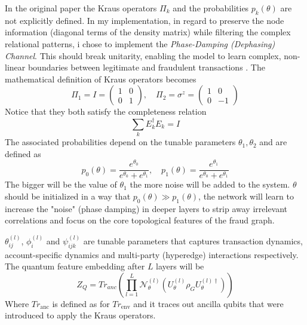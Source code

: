 In the original paper the Kraus operators \(\Pi_k\) and the probabilities \(p_k(\theta)\) are not explicitly defined. In my implementation, in regard to preserve the node information (diagonal terms of the density matrix) while filtering the complex relational patterns, i chose to implement the \textit{Phase-Damping (Dephasing) Channel}. This should break unitarity, enabling the model to learn complex, non-linear boundaries between legitimate and fraudulent transactions \cite{phasedamp}.
The mathematical definition of Kraus operators becomes
\begin{equation}
    \Pi_1 = I = \begin{pmatrix} 1 & 0 \\ 0 & 1 \end{pmatrix}, \quad \Pi_2 = \sigma^z = \begin{pmatrix} 1 & 0 \\ 0 & -1 \end{pmatrix}
\end{equation}
Notice that they both satisfy the completeness relation
\begin{equation}
    \sum_{k} E_k^\dagger E_k = I
\end{equation}
The associated probabilities depend on the tunable parameters \(\theta_1, \theta_2\) and are defined as
\begin{equation}
    p_0(\theta) = \frac{e^{\theta_0}}{e^{\theta_0} + e^{\theta_1}}, \quad p_1(\theta) = \frac{e^{\theta_1}}{e^{\theta_0} + e^{\theta_1}}
\end{equation}
The bigger will be the value of \(\theta_1\) the more noise will be added to the system. \(\theta\) should be initialized in a way that \(p_0(\theta) \gg p_1(\theta)\), the network will learn to increase the "noise" (phase damping) in deeper layers to strip away irrelevant correlations and focus on the core topological features of the fraud graph.

$\theta_{ij}^{(l)}$, $\phi_{i}^{(l)}$ and $\psi_{ijk}^{(l)}$ are tunable parameters that captures transaction dynamics, account-specific dynamics and multi-party (hyperedge) interactions respectively. The quantum feature embedding after $L$ layers will be
\begin{equation}
    Z_{Q}=Tr_{anc}\left(\prod_{l=1}^{L}\mathcal{N}_{\theta}^{(l)}(U_{\theta}^{(l)}\rho_{G}U_{\theta}^{(l)\dagger})\right)
\end{equation}
Where \(Tr_{\text{anc}}\) is defined as for \(Tr_{\text{env}}\) and it traces out ancilla qubits that were introduced to apply the Kraus operators.

